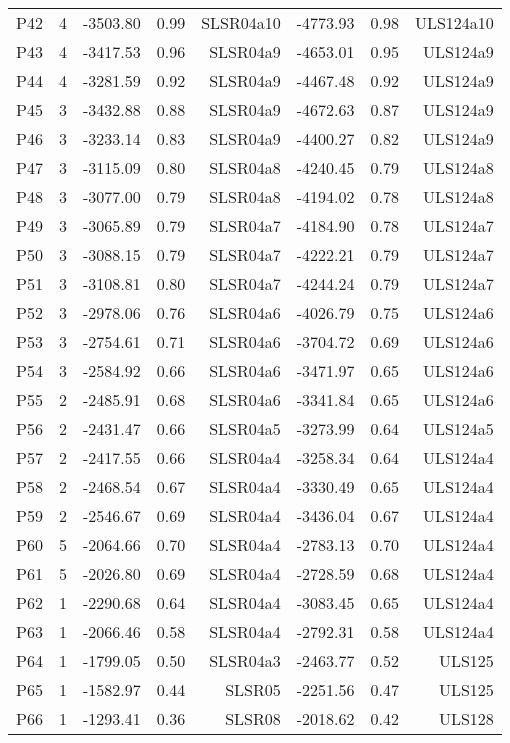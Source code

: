 \begin{center}
\begin{supertabular}{|c|c|rrr|rrr|}
P42 & 4 & -3503.80 & 0.99 & SLSR04a10 & -4773.93 & 0.98 & ULS124a10\\
P43 & 4 & -3417.53 & 0.96 & SLSR04a9 & -4653.01 & 0.95 & ULS124a9\\
P44 & 4 & -3281.59 & 0.92 & SLSR04a9 & -4467.48 & 0.92 & ULS124a9\\
P45 & 3 & -3432.88 & 0.88 & SLSR04a9 & -4672.63 & 0.87 & ULS124a9\\
P46 & 3 & -3233.14 & 0.83 & SLSR04a9 & -4400.27 & 0.82 & ULS124a9\\
P47 & 3 & -3115.09 & 0.80 & SLSR04a8 & -4240.45 & 0.79 & ULS124a8\\
P48 & 3 & -3077.00 & 0.79 & SLSR04a8 & -4194.02 & 0.78 & ULS124a8\\
P49 & 3 & -3065.89 & 0.79 & SLSR04a7 & -4184.90 & 0.78 & ULS124a7\\
P50 & 3 & -3088.15 & 0.79 & SLSR04a7 & -4222.21 & 0.79 & ULS124a7\\
P51 & 3 & -3108.81 & 0.80 & SLSR04a7 & -4244.24 & 0.79 & ULS124a7\\
P52 & 3 & -2978.06 & 0.76 & SLSR04a6 & -4026.79 & 0.75 & ULS124a6\\
P53 & 3 & -2754.61 & 0.71 & SLSR04a6 & -3704.72 & 0.69 & ULS124a6\\
P54 & 3 & -2584.92 & 0.66 & SLSR04a6 & -3471.97 & 0.65 & ULS124a6\\
P55 & 2 & -2485.91 & 0.68 & SLSR04a6 & -3341.84 & 0.65 & ULS124a6\\
P56 & 2 & -2431.47 & 0.66 & SLSR04a5 & -3273.99 & 0.64 & ULS124a5\\
P57 & 2 & -2417.55 & 0.66 & SLSR04a4 & -3258.34 & 0.64 & ULS124a4\\
P58 & 2 & -2468.54 & 0.67 & SLSR04a4 & -3330.49 & 0.65 & ULS124a4\\
P59 & 2 & -2546.67 & 0.69 & SLSR04a4 & -3436.04 & 0.67 & ULS124a4\\
P60 & 5 & -2064.66 & 0.70 & SLSR04a4 & -2783.13 & 0.70 & ULS124a4\\
P61 & 5 & -2026.80 & 0.69 & SLSR04a4 & -2728.59 & 0.68 & ULS124a4\\
P62 & 1 & -2290.68 & 0.64 & SLSR04a4 & -3083.45 & 0.65 & ULS124a4\\
P63 & 1 & -2066.46 & 0.58 & SLSR04a4 & -2792.31 & 0.58 & ULS124a4\\
P64 & 1 & -1799.05 & 0.50 & SLSR04a3 & -2463.77 & 0.52 & ULS125\\
P65 & 1 & -1582.97 & 0.44 & SLSR05 & -2251.56 & 0.47 & ULS125\\
P66 & 1 & -1293.41 & 0.36 & SLSR08 & -2018.62 & 0.42 & ULS128\\

\end{supertabular}
\end{center}
